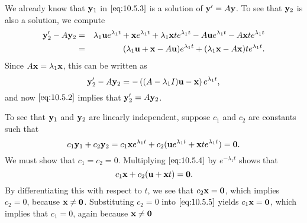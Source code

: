 \documentclass{ximera}
\begin{document}
We already know that ${\bf y}_1$ in $\eqref{eq:10.5.3}$ is a solution of
${\bf y}'=A{\bf y}$. To see that ${\bf y}_2$ is also a solution, we
compute
\begin{eqnarray*}
{\bf y}_2'-A{\bf y}_2&=&\lambda_1{\bf u}e^{\lambda_1t}+{\bf
x} e^{\lambda_1t}
+\lambda_1{\bf x} te^{\lambda_1t}-A{\bf
u}e^{\lambda_1t}-A{\bf x} te^{\lambda_1t}\\
&=&(\lambda_1{\bf u}+{\bf x} -A{\bf
u})e^{\lambda_1t}+(\lambda_1{\bf x} -A{\bf x} )te^{\lambda_1t}.
\end{eqnarray*}
Since $A{\bf x}=\lambda_1{\bf x}$, this can be written as
$$
{\bf y}_2'-A{\bf y}_2=-
\left((A-\lambda_1I){\bf u}-{\bf x}\right)e^{\lambda_1t},
$$
and now $\eqref{eq:10.5.2}$ implies that
${\bf y}_2'=A{\bf y}_2$.

To see that ${\bf y}_1$ and ${\bf y}_2$  are linearly independent,
suppose   $c_1$ and $c_2$ are constants such that
\begin{equation}\label{eq:10.5.4}
c_1{\bf y}_1+c_2{\bf y}_2=c_1{\bf x}e^{\lambda_1t}+c_2({\bf
u}e^{\lambda_1t} +{\bf x}te^{\lambda_1t})={\bf 0}.
\end{equation}
We must show that $c_1=c_2=0$.  Multiplying $\eqref{eq:10.5.4}$
by $e^{-\lambda_1t}$ shows that
\begin{equation}\label{eq:10.5.5}
c_1{\bf x}+c_2({\bf u} +{\bf x}t)={\bf 0}.
\end{equation}
By differentiating this with respect to $t$, we see that $c_2{\bf
x}={\bf 0}$, which implies $c_2=0$, because ${\bf x}\neq{\bf 0}$.
Substituting  $c_2=0$ into $\eqref{eq:10.5.5}$  yields $c_1{\bf x}={\bf 0}$,
which implies that $c_1=0$, again because ${\bf x}\neq{\bf 0}$
\end{document}
